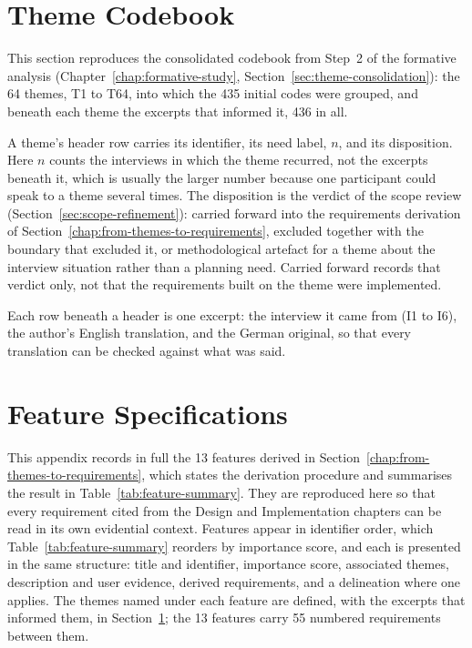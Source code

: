 \section{Theme Codebook}
\label{app:codebook}
This section reproduces the consolidated codebook from Step~2 of the formative analysis (Chapter~\ref{chap:formative-study}, Section~\ref{sec:theme-consolidation}): the 64 themes, T1 to T64, into which the 435 initial codes were grouped, and beneath each theme the excerpts that informed it, 436 in all.

A theme's header row carries its identifier, its need label, $n$, and its disposition. Here $n$ counts the interviews in which the theme recurred, not the excerpts beneath it, which is usually the larger number because one participant could speak to a theme several times. The disposition is the verdict of the scope review (Section~\ref{sec:scope-refinement}): carried forward into the requirements derivation of Section~\ref{chap:from-themes-to-requirements}, excluded together with the boundary that excluded it, or methodological artefact for a theme about the interview situation rather than a planning need. Carried forward records that verdict only, not that the requirements built on the theme were implemented.

Each row beneath a header is one excerpt: the interview it came from (I1 to I6), the author's English translation, and the German original, so that every translation can be checked against what was said.


\section{Feature Specifications}
\label{app:feature-specs}
This appendix records in full the 13 features derived in Section~\ref{chap:from-themes-to-requirements}, which states the derivation procedure and summarises the result in Table~\ref{tab:feature-summary}. They are reproduced here so that every requirement cited from the Design and Implementation chapters can be read in its own evidential context. Features appear in identifier order, which Table~\ref{tab:feature-summary} reorders by importance score, and each is presented in the same structure: title and identifier, importance score, associated themes, description and user evidence, derived requirements, and a delineation where one applies. The themes named under each feature are defined, with the excerpts that informed them, in Section~\ref{app:codebook}; the 13 features carry 55 numbered requirements between them.

